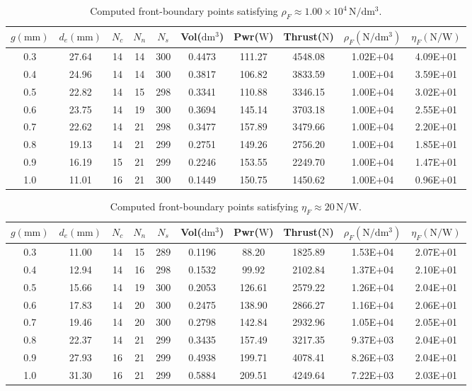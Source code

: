 \begin{table}[htbp]
	\scriptsize
	\centering
	\caption{Computed front-boundary points satisfying $\rho_F\approx1.00\times10^4\,\mathrm{N/dm^3}$.}
	\begin{tabular}{cccccccccc}
		\toprule
		$g(\mathrm{mm})$ & $d_e(\mathrm{mm})$ & $N_c$ & $N_n$ & $N_s$ & Vol($\mathrm{dm^3}$) & Pwr($\mathrm{W}$) & Thrust($\mathrm{N}$) & $\rho_F(\mathrm{N/dm^3})$ & $\eta_F(\mathrm{N/W})$ \\
		\midrule
		0.3 & 27.64 & 14 & 14 & 300 & 0.4473 & 111.27 & 4548.08 & 1.02E+04 & 4.09E+01 \\
		0.4 & 24.96 & 14 & 14 & 300 & 0.3817 & 106.82 & 3833.59 & 1.00E+04 & 3.59E+01 \\
		0.5 & 22.82 & 14 & 15 & 298 & 0.3341 & 110.88 & 3346.15 & 1.00E+04 & 3.02E+01 \\
		0.6 & 23.75 & 14 & 19 & 300 & 0.3694 & 145.14 & 3703.18 & 1.00E+04 & 2.55E+01 \\
		0.7 & 22.62 & 14 & 21 & 298 & 0.3477 & 157.89 & 3479.66 & 1.00E+04 & 2.20E+01 \\
		0.8 & 19.13 & 14 & 21 & 299 & 0.2751 & 149.26 & 2756.20 & 1.00E+04 & 1.85E+01 \\
		0.9 & 16.19 & 15 & 21 & 299 & 0.2246 & 153.55 & 2249.70 & 1.00E+04 & 1.47E+01 \\
		1.0 & 11.01 & 16 & 21 & 300 & 0.1449 & 150.75 & 1450.62 & 1.00E+04 & 0.96E+01 \\
		\bottomrule
	\end{tabular}
	\label{X_constraint}
\end{table}
\renewcommand\arraystretch{0.9}
\begin{table}[htbp]
	\scriptsize
	\centering
	\caption{Computed front-boundary points satisfying $\eta_F\approx20\,\mathrm{N/W}$.}
	\begin{tabular}{cccccccccc}
		\toprule
		$g(\mathrm{mm})$ & $d_e(\mathrm{mm})$ & $N_c$ & $N_n$ & $N_s$ & Vol($\mathrm{dm^3}$) & Pwr($\mathrm{W}$) & Thrust($\mathrm{N}$) & $\rho_F(\mathrm{N/dm^3})$ & $\eta_F(\mathrm{N/W})$ \\
		\midrule
		0.3 & 11.00 & 14 & 15 & 289 & 0.1196 & 88.20 & 1825.89 & 1.53E+04 & 2.07E+01 \\
		0.4 & 12.94 & 14 & 16 & 298 & 0.1532 & 99.92 & 2102.84 & 1.37E+04 & 2.10E+01 \\
		0.5 & 15.66 & 14 & 19 & 300 & 0.2053 & 126.61 & 2579.22 & 1.26E+04 & 2.04E+01 \\
		0.6 & 17.83 & 14 & 20 & 300 & 0.2475 & 138.90 & 2866.27 & 1.16E+04 & 2.06E+01 \\
		0.7 & 19.46 & 14 & 20 & 300 & 0.2798 & 142.84 & 2932.96 & 1.05E+04 & 2.05E+01 \\
		0.8 & 22.37 & 14 & 21 & 299 & 0.3435 & 157.49 & 3217.35 & 9.37E+03 & 2.04E+01 \\
		0.9 & 27.93 & 16 & 21 & 299 & 0.4938 & 199.71 & 4078.41 & 8.26E+03 & 2.04E+01 \\
		1.0 & 31.30 & 16 & 21 & 299 & 0.5884 & 209.51 & 4249.64 & 7.22E+03 & 2.03E+01 \\
		\bottomrule
	\end{tabular}
	\label{Y_constraint}
\end{table}
